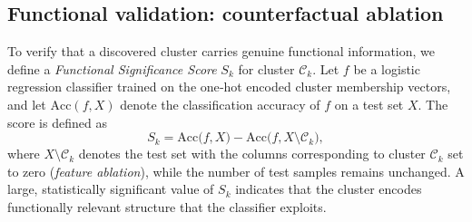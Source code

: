 \subsection{Functional validation: counterfactual ablation}
To verify that a discovered cluster carries genuine functional information, we define a \emph{Functional Significance Score} $S_k$ for cluster $\mathcal{C}_k$.
Let $f$ be a logistic regression classifier trained on the one‑hot encoded cluster membership vectors, and let $\mathrm{Acc}(f,X)$ denote the classification accuracy of $f$ on a test set $X$.
The score is defined as
\[
S_k = \mathrm{Acc}\bigl(f, X\bigr) - \mathrm{Acc}\bigl(f, X \setminus \mathcal{C}_k\bigr),
\]
where $X \setminus \mathcal{C}_k$ denotes the test set with the columns corresponding to cluster $\mathcal{C}_k$ set to zero (\emph{feature ablation}), while the number of test samples remains unchanged.
A large, statistically significant value of $S_k$ indicates that the cluster encodes functionally relevant structure that the classifier exploits.